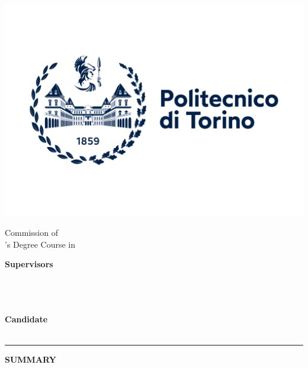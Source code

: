 \noindent
\begin{minipage}[c]{0.3\textwidth}%
    \includegraphics[width=\linewidth]{images/logo/logoPoliTo_with_name_2021.jpg}
\end{minipage}%
\hfill\vrule\hfill
\begin{minipage}[c]{0.65\textwidth}\raggedleft
    Commission of \textbf{\thesiscommission}\\
    \hfill\break
    \thesislevel's Degree Course in \textbf{\thesiscourse}\\
    \textit{\thesisfield}
\end{minipage}

\begin{center}
\large{\textbf{\thesistitle}}
\end{center}

\noindent
\begin{minipage}[t]{0.5\textwidth}
    \small
    \textbf{Supervisors}\\
    \xmakefirstuc{\thesissupervisoronetitle}~\thesissupervisoronename~\textsc{\thesissupervisoronesurname}\\
    \xmakefirstuc{\thesissupervisortwotitle}~\thesissupervisortwoname~\textsc{\thesissupervisortwosurname}\\
    \xmakefirstuc{\thesissupervisorthreetitle}~\thesissupervisorthreename~\textsc{\thesissupervisorthreesurname}
\end{minipage}
\hfill
\begin{minipage}[t]{0.4\textwidth}\raggedleft
    \small
    \textbf{Candidate}\\
    \thesiscandidatename~\textsc{\thesiscandidatesurname}\\
\end{minipage}

\vspace{0.2cm}
\par\noindent\rule{\textwidth}{0.2pt}

\begin{center}
\large{\textbf{SUMMARY}}
\end{center}